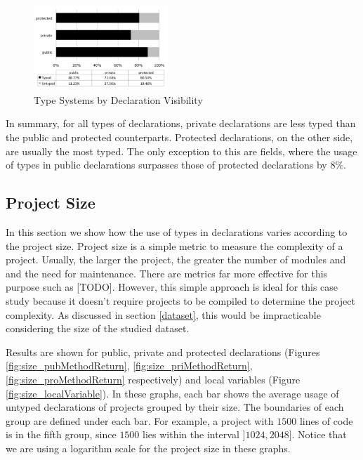 \documentclass[preprint]{sigplanconf}
\begin{document}
\begin{figure}[ht]
\centering \includegraphics[width=0.45\textwidth]{images/field_visibility} 
\caption{Type Systems by Declaration Visibility}
\label{fig:field_visibility} 
\end{figure}

In summary, for all types of declarations, private declarations are less typed than the public and protected counterparts.
Protected declarations, on the other side, are usually the most typed. The only exception to this are fields, where the usage of types in public declarations surpasses those of protected declarations by $8\%$.

\subsection{Project Size\label{sub:size-results}}
In this section we show how the use of types in declarations varies according to the project size. 
Project size is a simple metric to measure the complexity of a project.
Usually, the larger the project, the greater the number of modules and and the need for maintenance. 
There are metrics far more effective for this purpose such as [TODO].
However, this simple approach is ideal for this case study because it doesn't require projects to be compiled to determine the project complexity. 
As discussed in section \ref{dataset}, this would be impracticable considering the size of the studied dataset.

Results are shown for public, private and protected declarations (Figures \ref{fig:size_pubMethodReturn}, \ref{fig:size_priMethodReturn}, \ref{fig:size_proMethodReturn} respectively) and local variables (Figure \ref{fig:size_localVariable}). 
In these graphs, each bar shows the average usage of untyped declarations of projects grouped by their size.
The boundaries of each group are defined under each bar.
For example, a project with $1500$ lines of code is in the fifth group, since $1500$ lies within the interval $]1024, 2048]$.
Notice that we are using a logarithm scale for the project size in these graphs.
\end{document}
